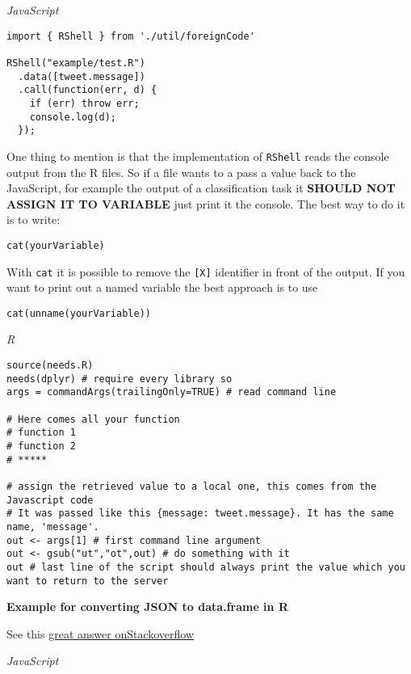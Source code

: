 \documentclass[]{article}
\begin{document}
\emph{JavaScript}

\begin{verbatim}
import { RShell } from './util/foreignCode'

RShell("example/test.R")
  .data([tweet.message])
  .call(function(err, d) {
    if (err) throw err;
    console.log(d);
  });
\end{verbatim}

One thing to mention is that the implementation of \texttt{RShell} reads
the console output from the R files. So if a file wants to a pass a
value back to the JavaScript, for example the output of a classification
task it \textbf{SHOULD NOT ASSIGN IT TO VARIABLE} just print it the
console. The best way to do it is to write:

\begin{verbatim}
cat(yourVariable)
\end{verbatim}

With \texttt{cat} it is possible to remove the \texttt{{[}X{]}}
identifier in front of the output. If you want to print out a named
variable the best approach is to use

\begin{verbatim}
cat(unname(yourVariable))
\end{verbatim}

\emph{R}

\begin{verbatim}
source(needs.R)
needs(dplyr) # require every library so
args = commandArgs(trailingOnly=TRUE) # read command line

# Here comes all your function
# function 1
# function 2
# *****

# assign the retrieved value to a local one, this comes from the Javascript code
# It was passed like this {message: tweet.message}. It has the same name, 'message'.
out <- args[1] # first command line argument
out <- gsub("ut","ot",out) # do something with it
out # last line of the script should always print the value which you want to return to the server
\end{verbatim}

\textbf{Example for converting JSON to data.frame in R}

See this \href{https://stackoverflow.com/a/16948174}{great answer
onStackoverflow}

\emph{JavaScript}
\end{document}
